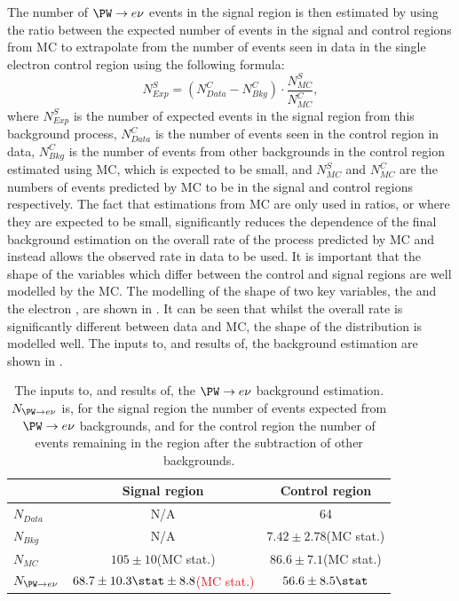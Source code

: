 The number of $\PW\rightarrow e\nu$ events in the signal region is then estimated by using the ratio between the expected number of events in the signal and control regions from \ac{MC} to extrapolate from the number of events seen in data in the single electron control region using the following formula:
\begin{equation}
  \label{eq:wdatabkg}
  N^{S}_{Exp}=\left(N^{C}_{Data}-N^{C}_{Bkg}\right)\cdot\frac{N^{S}_{MC}}{N^{C}_{MC}},
\end{equation}
where $N^{S}_{Exp}$ is the number of expected events in the signal region from this background process, $N^{C}_{Data}$ is the number of events seen in the control region in data, $N^{C}_{Bkg}$ is the number of events from other backgrounds in the control region estimated using \ac{MC}, which is expected to be small, and $N^{S}_{MC}$ and $N^{C}_{MC}$ are the numbers of events predicted by \ac{MC} to be in the signal and control regions respectively. The fact that estimations from \ac{MC} are only used in ratios, or where they are expected to be small, significantly reduces the dependence of the final background estimation on the overall rate of the process predicted by \ac{MC} and instead allows the observed rate in data to be used. It is important that the shape of the variables which differ between the control and signal regions are well modelled by the \ac{MC}. The modelling of the shape of two key variables, the \METnoMU and the electron \pt, are shown in . It can be seen that whilst the overall rate is significantly different between data and \ac{MC}, the shape of the distribution is modelled well.  The inputs to, and results of, the background estimation are shown in .

\begin{table}
  \caption{The inputs to, and results of, the $\PW\rightarrow e\nu$ background estimation. $N_{\PW\rightarrow e\nu}$ is, for the signal region the number of events expected from $\PW\rightarrow e\nu$ backgrounds, and for the control region the number of events remaining in the region after the subtraction of other backgrounds.}
  \label{tab:promptwenu}
  \begin{tabular}{lcc}
    \hline
    \hline
    & Signal region & Control region \\
    \hline
    \hline
    $N_{Data}$ & N/A & 64\\
    $N_{Bkg}$ & N/A & $7.42\pm2.78$(\ac{MC} stat.) \\
    $N_{MC}$& $105\pm10$(\ac{MC} stat.) & $86.6\pm 7.1$(\ac{MC} stat.) \\
    \hline
    $N_{\PW\rightarrow e\nu}$& \textcolor{red}{$68.7\pm 10.3\stat\pm 8.8$(MC stat.)} & $56.6\pm 8.5\stat$ \\
    \hline
    \hline
  \end{tabular}
\end{table}

